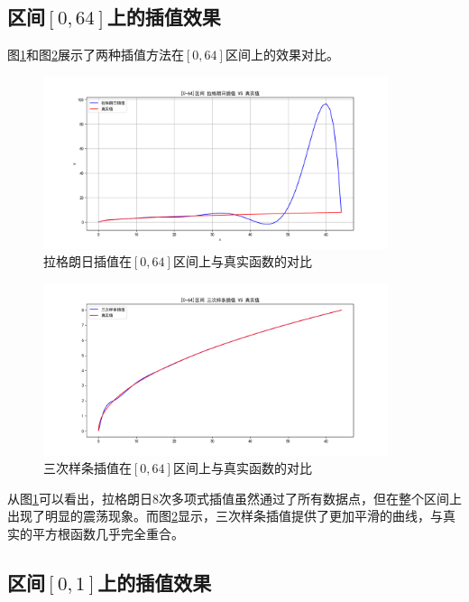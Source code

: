 \documentclass{article}
\begin{document}
\subsection{区间$[0,64]$上的插值效果}

图\ref{fig:lagrange_0_64}和图\ref{fig:spline_0_64}展示了两种插值方法在$[0,64]$区间上的效果对比。

\begin{figure}[H]
\centering
\includegraphics[width=0.9\textwidth]{./verify_results/lagrange/lagrange_interpolation_0_64.png}
\caption{拉格朗日插值在$[0,64]$区间上与真实函数的对比}
\label{fig:lagrange_0_64}
\end{figure}

\begin{figure}[H]
\centering
\includegraphics[width=0.9\textwidth]{./verify_results/CubicSpline/CubicSpline_0_64.png}
\caption{三次样条插值在$[0,64]$区间上与真实函数的对比}
\label{fig:spline_0_64}
\end{figure}

从图\ref{fig:lagrange_0_64}可以看出，拉格朗日8次多项式插值虽然通过了所有数据点，但在整个区间上出现了明显的震荡现象。而图\ref{fig:spline_0_64}显示，三次样条插值提供了更加平滑的曲线，与真实的平方根函数几乎完全重合。

\subsection{区间$[0,1]$上的插值效果}
\end{document}
